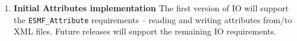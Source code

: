 
\begin{enumerate}

\item {\bf Initial Attributes implementation}  The first version of IO will
support the {\tt ESMF\_Attribute} requirements -- reading and writing attributes
from/to XML files.  Future releases will support the remaining IO requirements.

\end{enumerate}
